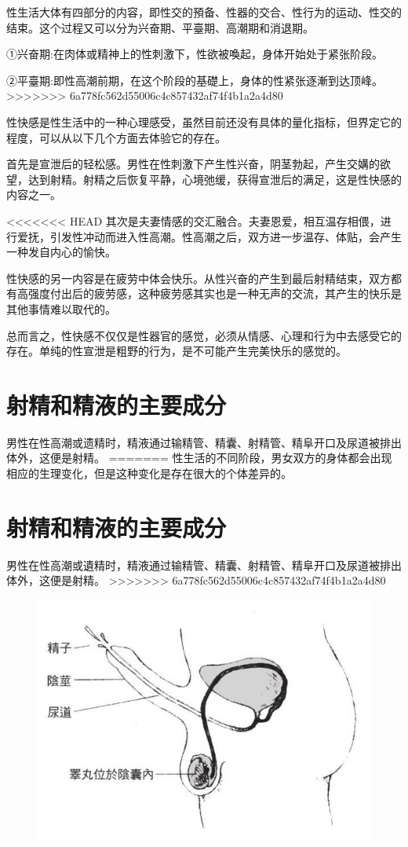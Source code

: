 \documentclass[12pt,UTF8]{ctexbook}
\begin{document}
性生活大体有四部分的内容，即性交的預备、性器的交合、性行为的运动、性交的结束。这个过程又可以分为兴奋期、平臺期、高潮期和消退期。

①兴奋期:在肉体或精神上的性刺激下，性欲被喚起，身体开始处于紧张阶段。

②平臺期:即性高潮前期，在这个阶段的基礎上，身体的性紧张逐漸到达顶峰。
>>>>>>> 6a778fc562d55006c4c857432af74f4b1a2a4d80

性快感是性生活中的一种心理感受，虽然目前还没有具体的量化指标，但界定它的程度，可以从以下几个方面去体验它的存在。

首先是宣泄后的轻松感。男性在性刺激下产生性兴奋，阴茎勃起，产生交媾的欲望，达到射精。射精之后恢复平静，心境弛缓，获得宣泄后的满足，这是性快感的内容之一。

<<<<<<< HEAD
其次是夫妻情感的交汇融合。夫妻恩爱，相互温存相偎，进行爱抚，引发性冲动而进入性高潮。性高潮之后，双方进一步温存、体贴，会产生一种发自内心的愉快。

性快感的另一内容是在疲劳中体会快乐。从性兴奋的产生到最后射精结束，双方都有高强度付出后的疲劳感，这种疲劳感其实也是一种无声的交流，其产生的快乐是其他事情难以取代的。

总而言之，性快感不仅仅是性器官的感觉，必须从情感、心理和行为中去感受它的存在。单纯的性宣泄是粗野的行为，是不可能产生完美快乐的感觉的。

\section{射精和精液的主要成分}

男性在性高潮或遗精时，精液通过输精管、精囊、射精管、精阜开口及尿道被排出体外，这便是射精。
=======
性生活的不同阶段，男女双方的身体都会出现相应的生理变化，但是这种变化是存在很大的个体差异的。

\section{射精和精液的主要成分}

男性在性高潮或遺精时，精液通过输精管、精囊、射精管、精阜开口及尿道被排出体外，这便是射精。
>>>>>>> 6a778fc562d55006c4c857432af74f4b1a2a4d80

\begin{figure}[htbp]
	\centering
	\includegraphics[width=0.7\linewidth]{5}
	\caption{}
\end{figure}
\end{document}
